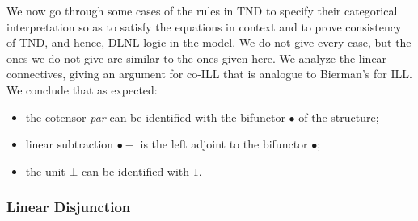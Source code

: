 \documentclass{lmcs}
\def\lsub{\mathrel{\bullet\!-}}
\begin{document}
We now go through some cases of the rules in TND to specify their
categorical interpretation so as to satisfy the equations in context
and to prove consistency of TND, and hence, DLNL logic in the model.
We do not give every case, but the ones we do not give are similar to
the ones given here. We analyze the linear connectives, giving an
argument for co-ILL that is analogue to Bierman's for ILL. We conclude
that as expected:
\begin{itemize}
\item the cotensor \emph{par} can be identified with the bifunctor
  $\bullet$ of the structure;
\item linear subtraction $\lsub$ is the left adjoint to the bifunctor
  $\bullet$;
\item the unit $\bot$ can be identified with $1$.
\end{itemize}

\subsubsection{Linear Disjunction}\label{lindisj} 
\end{document}
